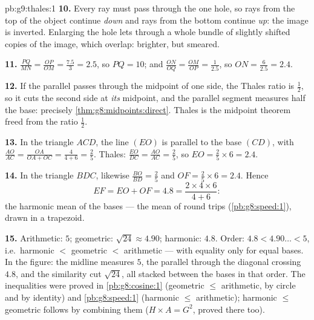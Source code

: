 \begin{solution}{pb:g9:thales:1}
\textbf{10.} Every ray must pass through the one hole, so rays
from the top of the object continue \emph{down} and rays from
the bottom continue \emph{up}: the image is inverted. Enlarging
the hole lets through a whole bundle of slightly shifted copies
of the image, which overlap: brighter, but smeared.

\textbf{11.} $\frac{PQ}{MN} = \frac{OP}{OM} = \frac{7.5}{3}
= 2.5$, so $PQ = 10$; and $\frac{ON}{OQ} = \frac{OM}{OP} =
\frac{1}{2.5}$, so $ON = \frac{6}{2.5} = 2.4$.

\textbf{12.} If the parallel passes through the midpoint of one
side, the Thales ratio is $\frac12$, so it cuts the second side
at \emph{its} midpoint, and the parallel segment measures half
the base: precisely \cref{thm:g8:midpoints:direct}. Thales is
the midpoint theorem freed from the ratio $\frac12$.

\textbf{13.} In the triangle $ACD$, the line $(EO)$ is parallel
to the base $(CD)$, with $\frac{AO}{AC} = \frac{OA}{OA + OC} =
\frac{4}{4 + 6} = \frac25$. Thales:
$\frac{EO}{DC} = \frac{AO}{AC} = \frac25$, so
$EO = \frac25 \times 6 = 2.4$.

\textbf{14.} In the triangle $BDC$, likewise
$\frac{BO}{BD} = \frac25$ and $OF = \frac25 \times 6 = 2.4$.
Hence
\[
EF = EO + OF = 4.8
= \frac{2 \times 4 \times 6}{4 + 6} :
\]
the harmonic mean of the bases --- the mean of round trips
(\cref{pb:g8:speed:1}), drawn in a trapezoid.

\textbf{15.} Arithmetic: $5$; geometric:
$\sqrt{24} \approx 4.90$; harmonic: $4.8$. Order:
$4.8 < 4.90\ldots < 5$, i.e.\ harmonic $<$ geometric $<$
arithmetic --- with equality only for equal bases. In the
figure: the midline measures $5$, the parallel through the
diagonal crossing $4.8$, and the similarity cut
$\sqrt{24}$, all stacked between the bases in that order. The
inequalities were proved in \cref{pb:g8:cosine:1} (geometric
$\leq$ arithmetic, by circle and by identity) and
\cref{pb:g8:speed:1} (harmonic $\leq$ arithmetic); harmonic
$\leq$ geometric follows by combining them ($H \times A = G^2$,
proved there too).
\end{solution}
